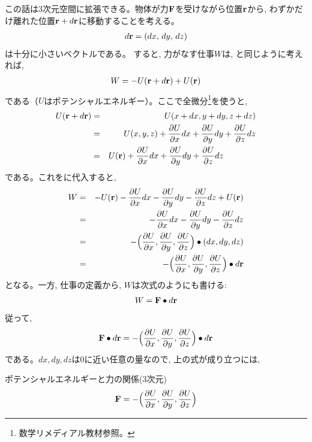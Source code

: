 この話は3次元空間に拡張できる。物体が力${\bf F}$を受けながら位置${\bf r}$から, 
わずかだけ離れた位置${\bf r}+d{\bf r}$に移動することを考える。
\begin{eqnarray}
d{\bf r}=(dx,\, dy,\, dz)
\end{eqnarray}
は十分に小さいベクトルである。
すると, 力がなす仕事$W$は, と同じように考えれば, 
\begin{eqnarray}
W=-U({\bf r}+d{\bf r})+U({\bf r})\label{eq:dW3D}
\end{eqnarray}
である（$U$はポテンシャルエネルギー）。ここで全微分\footnote{数学リメディアル教材参照。}を使うと, 
\begin{eqnarray}
U({\bf r}+d{\bf r})&=&U(x+dx, y+dy, z+dz)\nonumber\\
&=&U(x, y, z)+\frac{\partial U}{\partial x}dx+\frac{\partial U}{\partial y}dy+\frac{\partial U}{\partial z}dz\nonumber\\
&=&U({\bf r})+\frac{\partial U}{\partial x}dx+\frac{\partial U}{\partial y}dy+\frac{\partial U}{\partial z}dz\,\,\,\,\,\,\,\,\,\,\,\,\,\,\,\,\,\,\,\,\,\,\,
\end{eqnarray}
である。これをに代入すると, 
\begin{eqnarray}
W&=&-U({\bf r})-\frac{\partial U}{\partial x}dx-\frac{\partial U}{\partial y}dy-\frac{\partial U}{\partial z}dz+U({\bf r})\nonumber\\
 &=&-\frac{\partial U}{\partial x}dx-\frac{\partial U}{\partial y}dy-\frac{\partial U}{\partial z}dz\nonumber\\
 &=&-\Bigl(\frac{\partial U}{\partial x}, \frac{\partial U}{\partial y}, \frac{\partial U}{\partial z}\Bigr)\bullet(dx, dy, dz)\nonumber\\
 &=&-\Bigl(\frac{\partial U}{\partial x}, \frac{\partial U}{\partial y}, \frac{\partial U}{\partial z}\Bigr)\bullet d{\bf r}
\end{eqnarray}
となる。一方, 仕事の定義から, $W$は次式のようにも書ける:
\begin{eqnarray} 
W={\bf F}\bullet d{\bf r}\label{eq:W_Fdotdr}
\end{eqnarray} 
従って, 
\begin{eqnarray} 
{\bf F}\bullet d{\bf r}=-\Bigl(\frac{\partial U}{\partial x}, \frac{\partial U}{\partial y}, \frac{\partial U}{\partial z}\Bigr)\bullet d{\bf r}\label{eq:Fdr_gradUdr}
\end{eqnarray} 
である。$dx, dy, dz$は0に近い任意の量なので, 上の式が成り立つには, 
\begin{itembox}{ポテンシャルエネルギーと力の関係(3次元)}
\begin{eqnarray} 
{\bf F}=-\Bigl(\frac{\partial U}{\partial x}, \frac{\partial U}{\partial y}, \frac{\partial U}{\partial z}\Bigr)\label{eq:F_gradU}
\end{eqnarray} 
\end{itembox}
